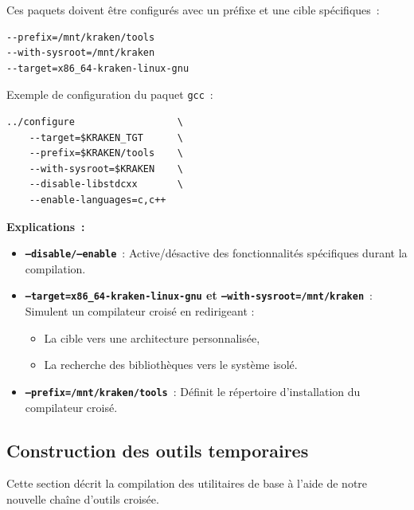        

Ces paquets doivent être configurés avec un préfixe et une cible spécifiques~:
\begin{verbatim}
--prefix=/mnt/kraken/tools
--with-sysroot=/mnt/kraken
--target=x86_64-kraken-linux-gnu
\end{verbatim}

\noindent
Exemple de configuration du paquet \texttt{gcc}~:

\begin{verbatim}
../configure                  \
    --target=$KRAKEN_TGT      \
    --prefix=$KRAKEN/tools    \
    --with-sysroot=$KRAKEN    \     
    --disable-libstdcxx       \
    --enable-languages=c,c++
\end{verbatim}

\textbf{Explications~:}
\begin{itemize}
  \item \textbf{\texttt{--disable/--enable}}~: 
        Active/désactive des fonctionnalités spécifiques durant la compilation.
        
  \item \textbf{\texttt{--target=x86\_64-kraken-linux-gnu} et \texttt{--with-sysroot=/mnt/kraken}}~: 
        Simulent un compilateur croisé en redirigeant :
        \begin{itemize}
          \item La cible vers une architecture personnalisée,
          \item La recherche des bibliothèques vers le système isolé.
        \end{itemize}
        
  \item \textbf{\texttt{--prefix=/mnt/kraken/tools}}~: 
        Définit le répertoire d’installation du compilateur croisé.
\end{itemize}


\subsection{Construction des outils temporaires}
\label{subsec:outils-temp}

Cette section décrit la compilation des utilitaires de base à l’aide de notre nouvelle chaîne d’outils croisée.


